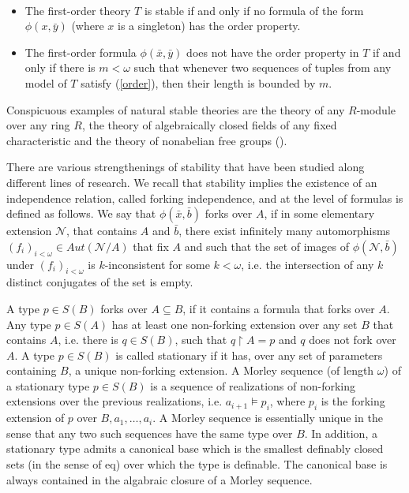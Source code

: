 \documentclass[a4paper,11pt]{article}
\begin{document}
\begin{fact}\ 
\begin{itemize}
\item The first-order theory $T$ is stable if and only if no formula of the form $\phi(x, \bar y)$ (where $x$ is a singleton) has the order property. 
\item The first-order formula $\phi(\bar x, \bar y)$ does not have the order property in $T$ if and only if there is $m<\omega$ such that whenever two sequences of tuples from any model of $T$ satisfy (\ref{order}), then their length is bounded by $m$.
\end{itemize}
\end{fact}

Conspicuous examples of natural stable theories are the theory of any $R$-module over any ring $R$, the theory of algebraically closed fields of any fixed characteristic and the theory of nonabelian free groups (\cite{Sela2013DiophantineVIIIStability}). 

There are various strengthenings of stability that have been studied along different lines of research. We recall that stability implies the existence of an independence relation, called forking independence, and at the level of formulas is defined as follows. We say that $\phi(\bar x, \bar b)$ forks over $A$, if in some elementary extension $\mathcal{N}$, that contains $A$ and $\bar b$, there exist infinitely many automorphisms $(f_i)_{i<\omega}\in Aut(\mathcal{N}/A)$ that fix $A$ and such that the set of images of $\phi(\mathcal{N},\bar b)$ under $(f_i)_{i<\omega}$ is $k$-inconsistent for some $k<\omega$, i.e. the intersection of any $k$ distinct conjugates of the set is empty. 

A type $p\in S(B)$ forks over $A\subseteq B$, if it contains a formula that forks over $A$. Any type $p\in S(A)$ has at least one non-forking extension over any set $B$ that contains $A$, i.e. there is $q\in S(B)$, such that $q\upharpoonright A=p$ and $q$ does not fork over $A$. A type $p\in S(B)$ is called stationary if it has, over any set of parameters containing $B$, a unique non-forking extension. A Morley sequence (of length $\omega$) of a stationary type $p\in S(B)$ is a sequence of realizations of non-forking extensions over the previous realizations, i.e. $a_{i+1}\models p_i$, where $p_i$ is the forking extension of $p$ over $B, a_1, \ldots, a_i$. A Morley sequence is essentially unique in the sense that any two such sequences have the same type over $B$. In addition, a stationary type admits a canonical base which is the smallest definably closed sets (in the sense of eq) over which the type is definable. The canonical base is always contained in the algabraic closure of a Morley sequence. 
\end{document}
